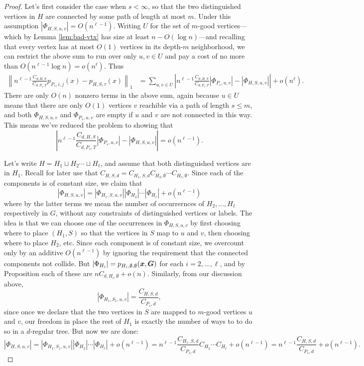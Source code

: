\begin{proof}
    Let's first consider the case when $s < \infty$, so that the two distinguished vertices in $H$ are connected by some path of length at most $m$. Under this assumption $|\Phi_{H,S,u,v}| = O(n^{\ell - 1})$. Writing $U$ for the set of $m$-good vertices---which by Lemma \ref{lem:bad-vtx} has size at least $n - O(\log n)$---and recalling that every vertex has at most $O(1)$ vertices in its depth-$m$ neighborhood, we can restrict the above sum to run over only $u,v \in U$ and pay a cost of no more than $O(n^{\ell - 1}\log n) = o(n^\ell)$. Thus
    \begin{align*}
        \left\| n^{\ell - 1}\frac{C_{d,H,S}}{C_{d,P_s,T}} p_{P_s,i,j}(x) - p_{H,S,\tau}(x) \right\|_1 
        &= \sum_{u,v \in U} \left|n^{\ell - 1}\frac{C_{d,H,S}}{C_{d,P_s,T}}|\Phi_{P_s,u,v}| - |\Phi_{H,S,u,v}| \right| + o(n^\ell).
    \end{align*}
    There are only $O(n)$ nonzero terms in the above sum, again because $u\in U$ means that there are only $O(1)$ vertices $v$ reachible via a path of length $s \le m$, and both $\Phi_{H,S,u,v}$ and $\Phi_{P_s,u,v}$ are empty if $u$ and $v$ are not connected in this way. This means we've reduced the problem to showing that
    $$
        \left|n^{\ell - 1}\frac{C_{d,H,S}}{C_{d,P_s,T}}|\Phi_{P_s,u,v}| - |\Phi_{H,S,u,v}| \right| = o(n^{\ell - 1}).
    $$

    Let's write $H = H_1 \sqcup H_2 \cdots \sqcup H_\ell$, and assume that both distinguished vertices are in $H_1$. Recall for later use that $C_{H,S,d} = C_{H_1,S,d} C_{H_2,\emptyset}\cdots C_{H_\ell,\emptyset}$. Since each of the components is of constant size, we claim that
    $$
        |\Phi_{H,S,u,v}| = |\Phi_{H_1,S,u,v}| |\Phi_{H_2}| \cdots |\Phi_{H_\ell}| + o(n^{\ell - 1})
    $$
    where by the latter terms we mean the number of occurrernces of $H_2,...,H_\ell$ respectively in $G$, without any constraints of distinguished vertices or labels. The idea is that we can choose one of the occurrences in $\Phi_{H,S,u,v}$ by first choosing where to place $(H_1,S)$ so that the vertices in $S$ map to $u$ and $v$, then choosing where to place $H_2$, etc. Since each component is of constant size, we overcount only by an additive $O(n^{\ell - 1})$ by ignoring the requirement that the connected components not collide. But $|\Phi_{H_i}| = p_{H_i,\emptyset,\emptyset}({\boldsymbol{x}},\boldsymbol{G})$ for each $i=2,...,\ell$, and by Proposition each of these are $nC_{d,H_i,\emptyset} + o(n)$. Similarly, from our discussion above,
    $$
        |\Phi_{H_1,S_1,u,v}| = \frac{C_{H,S,d}}{C_{P_s,d}},
    $$
    since once we declare that the two vertices in $S$ are mapped to $m$-good vertices $u$ and $v$, our freedom in place the rest of $H_1$ is exactly the number of ways to to do so in a $d$-regular tree. But now we are done:
    $$
        |\Phi_{H,S,u,v}| = |\Phi_{H_1,S_1,u,v}||\Phi_{H_2}|\cdots |\Phi_{H_\ell}| + o(n^{\ell - 1}) = n^{\ell - 1}\frac{C_{H_1,S,d}}{C_{P_s,d}}C_{H_2}\cdots C_{H_\ell} + o(n^{\ell - 1}) = n^{\ell - 1}\frac{C_{H,S,d}}{C_{P_s,d}} + o(n^{\ell - 1}).
    $$


\end{proof}
